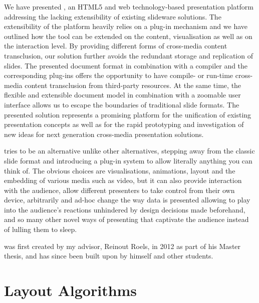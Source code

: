     We have presented \mxp, an HTML5 and web technology-based presentation
    platform addressing the lacking extensibility of existing slideware
    solutions. The extensibility of the \mxp platform heavily relies on a
    plug-in mechanism and we have outlined how the tool can be extended on the
    content, visualisation as well as on the interaction level. By providing
    different forms of cross-media content transclusion, our solution further
    avoids the redundant storage and replication of slides. The presented \mxp
    document format in combination with a compiler and the corresponding
    plug-ins offers the opportunity to have compile- or run-time cross-media
    content transclusion from third-party resources. At the same time, the
    flexible and extensible document model in combination with a zoomable user
    interface allows us to escape the boundaries of traditional slide formats.
    The presented \mxp solution represents a promising platform for the
    unification of existing presentation concepts as well as for the rapid
    prototyping and investigation of new ideas for next generation cross-media
    presentation solutions.


    \mxp tries to be an alternative unlike other alternatives, stepping away
    from the classic slide format and introducing a plug-in system to allow
    literally anything you can think of. The obvious choices are
    visualisations, animations, layout and the embedding of various media such
    as video, but it can also provide interaction with the audience, allow
    different presenters to take control from their own device, arbitrarily and
    ad-hoc change the way data is presented allowing to play into the
    audience's reactions unhindered by design decisions made beforehand, and so
    many other novel ways of presenting that captivate the audience instead of
    lulling them to sleep.

    \mxp was first created by my advisor, Reinout Roels, in 2012 as part of his
    Master thesis, and has since been built upon by himself and other students.


  \section{Layout Algorithms}
   \label{layout-algorithms}


